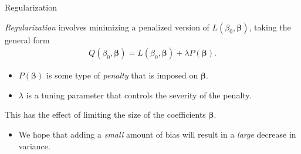 \documentclass[8pt]{beamer}
\newcommand{\mys}{\vspace{0.5cm} \pause
}
\begin{document}
\begin{frame}{Regularization}

\textit{Regularization} involves minimizing a penalized version of $L(\beta_0, \bm{\beta})$, taking the general form 
\begin{align*}
    Q(\beta_0, \bm{\beta}) = L(\beta_0, \bm{\beta}) + \lambda P(\bm{\beta}).
\end{align*}
\begin{itemize}
    \item $P(\bm{\beta})$ is some type of \textit{penalty} that is imposed on $\bm{\beta}$.
    \item $\lambda$ is a tuning parameter that controls the severity of the penalty.
\end{itemize} \mys 

This has the effect of limiting the size of the coefficients $\bm{\beta}$.
\begin{itemize}
    \item We hope that adding a \textit{small} amount of bias will result in a \textit{large} decrease in variance.
\end{itemize}
    
\end{frame}



    
\end{document}
